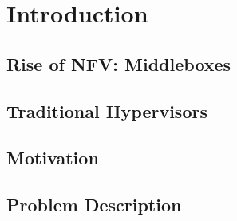 \documentclass[a4paper,11pt]{report}
\begin{document}

\newpage
\tableofcontents
\listoffigures
\listoftables
\newpage
\chapter{Introduction}
\section{Rise of NFV: Middleboxes}
\section{Traditional Hypervisors}
\section{Motivation}        
\section{Problem Description}
\end{document}

